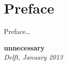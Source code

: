 \chapter*{Preface}

Preface\ldots

\begin{flushright}
\LARGE\textbf{unnecessary}
{\makeatletter\itshape
    \@firstname\ \@lastname \\
    Delft, January 2013
\makeatother}
\end{flushright}

